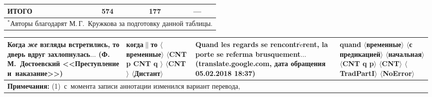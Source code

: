 \begin{multicols}{2}
\begin{enumerate}[(1)]
\begin{table*}
\begin{center}
\begin{tabular}{|l|c|c|c|}
\hline
ИТОГО&574\hphantom{9}&177\hphantom{99}&---\\
\hline
\multicolumn{4}{l}{\footnotesize \hspace*{2mm}$^*$Авторы благодарят М.\,Г.~Кружкова за подготовку данной таблицы.}
\end{tabular}
\end{center}
\begin{center}
\vspace*{2ex}

\tabcolsep=8pt
\begin{tabular}{|p{57mm}|p{23mm}|p{38mm}|p{25mm}|}
\hline
\textbf{Когда} \textit{же} взгляды встретились, \textbf{то} дверь вдруг 
захлопнулась$\ldots$\newline
\newline
\newline
\newline
\newline
(Ф.\,М.~Достоевский <<Преступление и~на\-ка\-за\-ние>>)  &
 \textbf{когда}$\|$\textbf{то}\newline
$\langle$временные$\rangle$\newline
$\langle$CNT p CNT q $\rangle$\newline
$\langle$CNT $\rangle$\newline
$\langle$Дистант$\rangle$ &
\textbf{Quand} les regards se rencontr$\grave{\mbox{e}}$rent, la porte se referma 
brusquement$\ldots$\newline
\newline
\newline
({\sf translate.google.com}, дата обращения 05.02.2018 18:37) 
&  \textbf{quand}\newline
$\langle$временные$\rangle$\newline 
$\langle$с предикацией$\rangle$\newline
$\langle$начальная$\rangle$\newline
$\langle$CNT q p$\rangle$\newline 
$\langle$CNT$\rangle$\newline
$\langle$TradPartI$\rangle$\newline
$\langle$NoError$\rangle$\\
\hline
\multicolumn{4}{p{158mm}}{\footnotesize
    \hspace*{2mm}\textbf{Примечания:} (1)~с~момента записи аннотации изменился вариант перевода, 
}
\end{tabular}
\end{center}
\end{table*}
\end{enumerate}
\end{multicols}
